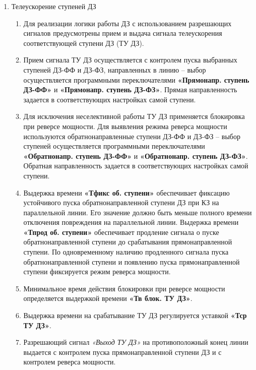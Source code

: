 \begin{enumerate}[label=\arabic{section}.\arabic{subsection}.\arabic{enumi}, labelsep=4pt, leftmargin=0pt, itemindent=57pt, itemsep=0pt, parsep=5pt]
\item Телеускорение ступеней ДЗ
\begin{enumerate}[label=\arabic{section}.\arabic{subsection}.\arabic{enumi}.\arabic*, labelsep=4pt, leftmargin=0em, itemindent=65pt, parsep=0pt]

\item
Для реализации логики работы ДЗ с использованием разрешающих сигналов предусмотрены прием и выдача сигнала телеускорения соответствующей ступени ДЗ (ТУ ДЗ).

\item
Прием сигнала ТУ ДЗ осуществляется с контролем пуска выбранных ступеней ДЗ-ФФ и ДЗ-ФЗ, направленных в линию -- выбор осуществляется программными переключателями \textbf{«Прямонапр. ступень ДЗ-ФФ»} и \textbf{«Прямонапр. ступень ДЗ-ФЗ»}. Прямая направленность задается в соответствующих настройках самой ступени.

\item
Для исключения неселективной работы ТУ ДЗ применяется блокировка при реверсе мощности. Для выявления режима реверса мощности используются обратнонаправленные ступени ДЗ-ФФ и ДЗ-ФЗ -- выбор ступеней осуществляется программными переключателями \textbf{«Обратнонапр. ступень ДЗ-ФФ»} и \textbf{«Обратнонапр. ступень ДЗ-ФЗ»}. Обратная направленность задается в соответствующих настройках самой ступени.

\item
Выдержка времени \textbf{«Тфикс об. ступени»} обеспечивает фиксацию устойчивого пуска обратнонаправленной ступени ДЗ при КЗ на параллельной линии. Его значение должно быть меньше полного времени отключения повреждения на параллельной линии. Выдержка времени \textbf{«Тпрод об. ступени»} обеспечивает продление сигнала о пуске обратнонаправленной ступени до срабатывания прямонаправленной ступени. По одновременному наличию продленного сигнала пуска обратнонаправленной ступени и появлению пуска прямонаправленной ступени фиксируется режим реверса мощности. 

\item
Минимальное время действия блокировки при реверсе мощности определяется выдержкой времени \textbf{«Тв блок. ТУ ДЗ»}.

\item
Выдержка времени на срабатывание ТУ ДЗ регулируется уставкой \textbf{«Тср ТУ ДЗ»}.

\item
Разрешающий сигнал \textit{«Выход ТУ ДЗ»} на противоположный конец линии выдается с контролем пуска прямонаправленной ступени ДЗ и с контролем реверса мощности.


\end{enumerate}
\end{enumerate}

